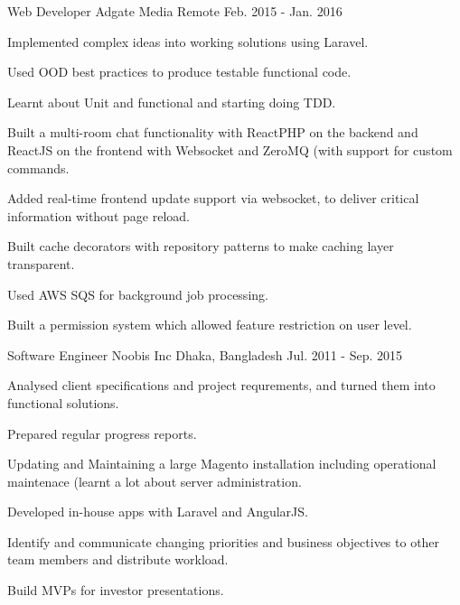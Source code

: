 \begin{cventries}
  \cventry
    {Web Developer} %
    {Adgate Media} %
    {Remote} %
    {Feb. 2015 - Jan. 2016} %
    {
      \begin{cvitems} %
        \item {Implemented complex ideas into working solutions using Laravel.}
        \item {Used OOD best practices to produce testable functional code.}
        \item {Learnt about Unit and functional and starting doing TDD.}
        \item {Built a multi-room chat functionality with ReactPHP on the backend and ReactJS on the frontend with Websocket and ZeroMQ (with support for custom commands.}
        \item {Added real-time frontend update support via websocket, to deliver critical information without page reload.}
        \item {Built cache decorators with repository patterns to make caching layer transparent.}
        \item {Used AWS SQS for background job processing.}
        \item {Built a permission system which allowed feature restriction on user level.}
      \end{cvitems}
    }

  \cventry
    {Software Engineer} %
    {Noobis Inc} %
    {Dhaka, Bangladesh} %
    {Jul. 2011 - Sep. 2015} %
    {
      \begin{cvitems} %
        \item {Analysed client specifications and project requrements, and turned them into functional solutions.}
        \item {Prepared regular progress reports.}
        \item {Updating and Maintaining a large Magento installation including operational maintenace (learnt a lot about server administration.}
        \item {Developed in-house apps with Laravel and AngularJS.}
        \item {Identify and communicate changing priorities and business objectives to other team members and distribute workload.}
        \item {Build MVPs for investor presentations.}
      \end{cvitems}
    }



\end{cventries}

